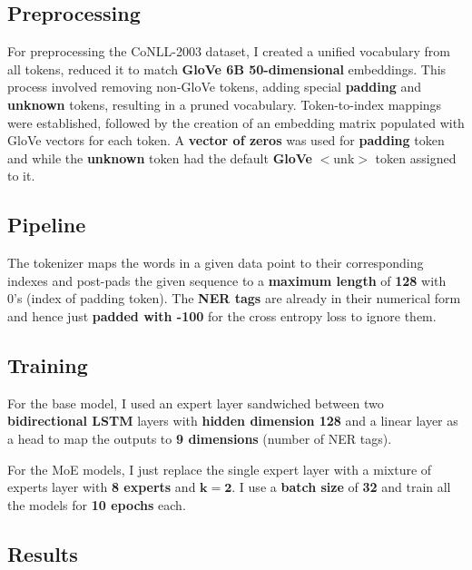 \documentclass[12pt]{article}
\begin{document}
\subsection{Preprocessing}
For preprocessing the CoNLL-2003 dataset, I created a unified vocabulary from all tokens, reduced it to match \textbf{GloVe 6B 50-dimensional} embeddings. This process involved removing non-GloVe tokens, adding special \textbf{padding} and \textbf{unknown} tokens, resulting in a pruned vocabulary. Token-to-index mappings were established, followed by the creation of an embedding matrix populated with GloVe vectors for each token. A \textbf{vector of zeros} was used for \textbf{padding} token and while the \textbf{unknown} token had the default \textbf{GloVe} $<$unk$>$ token assigned to it.
\subsection{Pipeline}
The tokenizer maps the words in a given data point to their corresponding indexes and post-pads the given sequence to a \textbf{maximum length} of \textbf{128} with 0's (index of padding token). The \textbf{NER tags} are already in their numerical form and hence just \textbf{padded with -100} for the cross entropy loss to ignore them.

\subsection{Training}
For the base model, I used an expert layer sandwiched between two \textbf{bidirectional LSTM} layers with \textbf{hidden dimension 128} and a linear layer as a head to map the outputs to \textbf{9 dimensions} (number of NER tags).

For the MoE models, I just replace the single expert layer with a mixture of experts layer with \textbf{8 experts} and $\boldsymbol{k=2}$. I use a \textbf{batch size} of \textbf{32} and train all the models for \textbf{10 epochs} each.

\subsection{Results}
\end{document}
